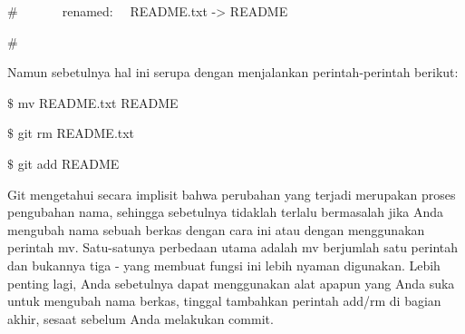 \noindent 
 $  \#  $~~~~~~~renamed:~~  README.txt -> README \par
\noindent 
 $  \#  $ \par
\noindent 
Namun sebetulnya hal ini serupa dengan menjalankan perintah-perintah berikut: \par
\noindent 
 $  \$  $ mv README.txt README \par
\noindent 
 $  \$  $ git rm README.txt \par
\noindent 
 $  \$  $ git add README \par
\noindent 
Git mengetahui secara implisit bahwa perubahan yang terjadi merupakan proses pengubahan nama, sehingga sebetulnya tidaklah terlalu bermasalah jika Anda mengubah nama sebuah berkas dengan cara ini atau dengan menggunakan perintah mv. Satu-satunya perbedaan utama adalah mv berjumlah satu perintah dan bukannya tiga - yang membuat fungsi ini lebih nyaman digunakan. Lebih penting lagi, Anda sebetulnya dapat menggunakan alat apapun yang Anda suka untuk mengubah nama berkas, tinggal tambahkan perintah add/rm di bagian akhir, sesaat sebelum Anda melakukan commit. \par
\vspace{12pt}
\vspace{12pt}
\vspace{12pt}
\vspace{12pt}
